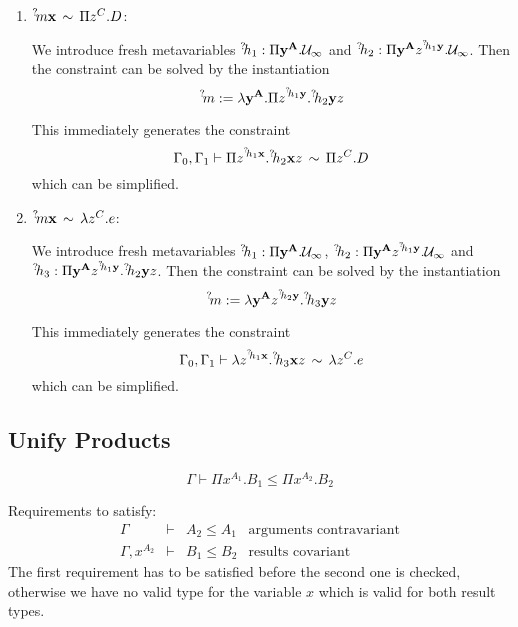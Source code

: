 \begin{enumerate}
    \item ${{}^? \kern-0.2em m} {\mathbf x} \,\sim\, \Pi z^C. D$:

        We introduce fresh metavariables
        ${{}^? \kern-0.2em h}_1: \Pi {\mathbf y}^{{\mathbf A}}. {{\cal U}_\infty}$
        and
        ${{}^? \kern-0.2em h}_2: \Pi {\mathbf y}^{{\mathbf A}} z^{{{}^? \kern-0.2em h}_1 {\mathbf y}} . {{\cal U}_\infty}$.
        Then the constraint can be solved by the instantiation
        $$
            {{}^? \kern-0.2em m}
            :=
            \lambda {\mathbf y}^{{\mathbf A}}
            . \Pi z^{{{}^? \kern-0.2em h}_1 {\mathbf y}}. {{}^? \kern-0.2em h}_2 {\mathbf y} z
        $$

        This immediately generates the constraint
        $$
            \Gamma_0, \Gamma_1
            \vdash
            \Pi z^{{{}^? \kern-0.2em h}_1 {\mathbf x}} . {{}^? \kern-0.2em h}_2 {\mathbf x} z
            \,\sim\,
            \Pi z^C . D
        $$
        which can be simplified.

    \item ${{}^? \kern-0.2em m} {\mathbf x} \,\sim\, \lambda z^C. e$:

        We introduce fresh metavariables
        ${{}^? \kern-0.2em h}_1: \Pi {\mathbf y}^{{\mathbf A}}. {{\cal U}_\infty}$,
        ${{}^? \kern-0.2em h}_2: \Pi {\mathbf y}^{{\mathbf A}} z^{{{}^? \kern-0.2em h}_1 {\mathbf y}} . {{\cal U}_\infty}$
        and
        ${{}^? \kern-0.2em h}_3
        : \Pi {\mathbf y}^{{\mathbf A}} z^{{{}^? \kern-0.2em h}_1 {\mathbf y}}
          . {{}^? \kern-0.2em h}_2 {\mathbf y} z
        $.
        Then the constraint can be solved by the instantiation
        $$
            {{}^? \kern-0.2em m}
            :=
            \lambda {\mathbf y}^{{\mathbf A}} z^{{{}^? \kern-0.2em h}_2 {\mathbf y}}
            . {{}^? \kern-0.2em h}_3 {\mathbf y} z
        $$

        This immediately generates the constraint
        $$
            \Gamma_0, \Gamma_1
            \vdash
            \lambda z^{{{}^? \kern-0.2em h}_1 {\mathbf x}} . {{}^? \kern-0.2em h}_3 {\mathbf x} z
            \,\sim\,
            \lambda z^C . e
        $$
        which can be simplified.
\end{enumerate}






\subsection{Unify Products}

$$
    \Gamma \vdash \Pi x^{A_1}. B_1 \le \Pi x^{A_2}. B_2
$$

Requirements to satisfy:
$$
\begin{array}{llll}
    \Gamma &\vdash&
    A_2 \le A_1
    &\text{arguments contravariant}
    \\
    \Gamma, x^{A_2} &\vdash&
    B_1 \le B_2
    &\text{results covariant}
\end{array}
$$
The first requirement has to be satisfied before the second one is checked,
otherwise we have no valid type for the variable $x$ which is valid for both
result types.

